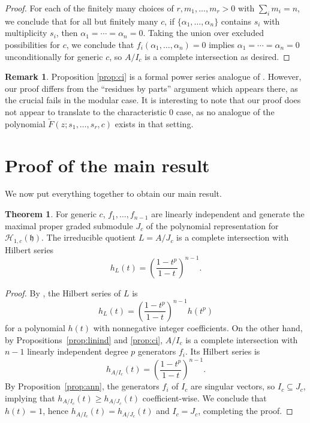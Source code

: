 \documentclass{elsarticle}
\numberwithin{equation}{section}
\theoremstyle{definition}
\newtheorem{theorem}{Theorem}[section]
\newtheorem*{remark}{Remark}
\newcommand{\h}{\mathfrak{h}}
\newcommand{\HH}{\mathcal{H}}
\newcommand{\wF}{\widetilde{F}}
\begin{document}
\begin{proof}
For each of the finitely many choices of $r, m_1, \ldots, m_r > 0$ with $\sum_i m_i = n$, we conclude that for all but finitely many $c$, if $\{\alpha_1, \ldots, \alpha_n\}$ contains $s_i$ with multiplicity $s_i$, then $\alpha_1 = \cdots = \alpha_n = 0$.  Taking the union over excluded possibilities for $c$, we conclude that $f_i(\alpha_1, \ldots, \alpha_n) = 0$ implies $\alpha_1 = \cdots = \alpha_n = 0$ unconditionally for generic $c$, so $A/I_c$ is a complete intersection as desired.
\end{proof}

\begin{remark}
Proposition \ref{prop:ci} is a formal power series analogue of \cite[Theorem 3.2]{CE}.  However, our proof differs from the ``residues by parts'' argument which appears there, as the crucial \cite[Lemma 3.2]{CE} fails in the modular case.  It is interesting to note that our proof does not appear to translate to the characteristic $0$ case, as no analogue of the polynomial $\wF(z; s_1, \ldots, s_r, c)$ exists in that setting.
\end{remark}

\section{Proof of the main result}

We now put everything together to obtain our main result.

\begin{theorem}\label{thm:main}
For generic $c$, $f_1, \ldots, f_{n-1}$ are linearly independent and generate the maximal proper graded submodule $J_c$ of the polynomial representation for $\HH_{1, c}(\h)$.  The irreducible quotient $L = A/J_c$ is a complete intersection with Hilbert series 
\[
h_L(t) = \left(\frac{1-t^p}{1-t}\right)^{n-1}.
\]
\end{theorem}
\begin{proof}
By \cite[Proposition 3.4]{BC1}, the Hilbert series of $L$ is 
\[
h_L(t) = \left(\frac{1-t^p}{1-t}\right)^{n-1}h(t^p)
\]
for a polynomial $h(t)$ with nonnegative integer coefficients.  On the other hand, by Propositions~\ref{prop:linind} and \ref{prop:ci}, $A/I_c$ is a complete intersection with $n-1$ linearly independent degree $p$ generators $f_i$. Its Hilbert series is
\[
h_{A/I_c}(t)=\left(\frac{1-t^p}{1-t}\right)^{n-1}.
\]
By Proposition~\ref{prop:ann}, the generators $f_i$ of $I_c$ are singular vectors, so $I_c \subseteq J_c$, implying that $h_{A/I_c}(t) \ge h_{A/J_c}(t)$ coefficient-wise.  We conclude that $h(t) = 1$, hence $h_{A/I_c}(t)=h_{A/J_c}(t)$ and $I_c=J_c$, completing the proof.
\end{proof}
\end{document}
